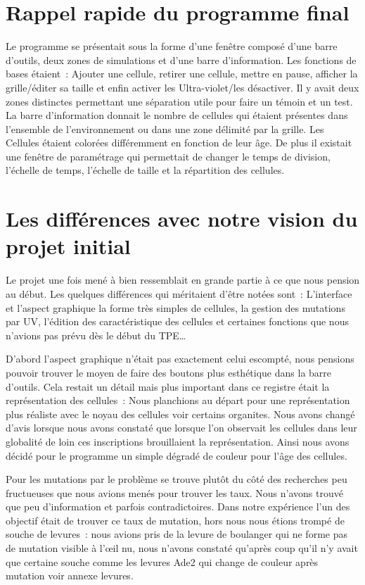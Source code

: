 \section{Rappel rapide du programme final}
Le programme se présentait sous la forme d’une fenêtre composé d’une barre d’outils, deux zones de simulations et d’une barre d’information. Les fonctions de bases étaient : Ajouter une cellule, retirer une cellule, mettre en pause, afficher la grille/éditer sa taille et enfin activer les Ultra-violet/les désactiver. Il y avait deux zones distinctes permettant une séparation utile pour faire un témoin et un test. La barre d’information donnait le nombre de cellules qui étaient présentes dans l’ensemble de l’environnement ou dans une zone délimité par la grille. Les Cellules étaient colorées différemment en fonction de leur âge. De plus il existait une fenêtre de paramétrage qui permettait de changer le temps de division, l’échelle de temps, l’échelle de taille et la répartition des cellules.

\section{Les différences avec notre vision du projet initial}
Le projet une fois mené à bien ressemblait en grande partie à ce que nous pension au début. Les quelques différences qui méritaient d’être notées sont : L’interface et l’aspect graphique la forme très simples de cellules, la gestion des mutations par UV, l’édition des caractéristique des cellules et certaines fonctions que nous n’avions pas prévu dès le début du TPE…

D’abord l’aspect graphique n’était pas exactement celui escompté, nous pensions pouvoir trouver le moyen de faire des boutons plus esthétique dans la barre d’outils. Cela restait un détail mais plus important dans ce registre était la représentation des cellules : Nous planchions au départ pour une représentation plus réaliste avec le noyau des cellules voir certains organites. Nous avons changé d’avis lorsque nous avons constaté que lorsque l’on observait les cellules dans leur globalité de loin ces inscriptions brouillaient la représentation. Ainsi nous avons décidé pour le programme un simple dégradé de couleur pour l’âge des cellules.

 Pour les mutations par le problème se trouve plutôt du côté des recherches peu fructueuses que nous avions menés pour trouver les taux. Nous n’avons trouvé que peu d’information et parfois contradictoires. Dans notre expérience l’un des objectif était de trouver ce taux de mutation, hors nous nous étions trompé de souche de levures : nous avions pris de la levure de boulanger qui ne forme pas de mutation visible à l’œil nu, nous n’avons constaté qu’après coup qu’il n’y avait que certaine souche comme les levures Ade2 qui change de couleur après mutation voir annexe levures.
 
